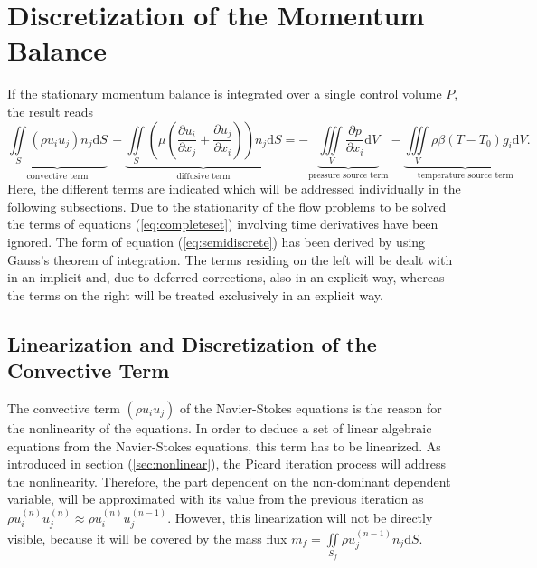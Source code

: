 \section{Discretization of the Momentum Balance}
\label{sec:segdiscretization}

If the stationary momentum balance is integrated over a single control volume \(P\), the result reads
\begin{equation}
  \label{eq:semidiscrete}
  \underbrace{\iint\limits_S (\rho u_i u_j)n_j \mathrm{d}S}_{\text{convective term}}
  \,- \underbrace{\iint\limits_S \left(\mu \left( \frac{\partial u_i}{\partial x_j} + \frac{\partial u_j}{\partial x_i}\right)\right)n_j \mathrm{d}S}_{\text{diffusive term}}
  = - \underbrace{\iiint\limits_V \frac{\partial p}{\partial x_i} \mathrm{d}V}_{\text{pressure source term}}
  - \underbrace{\iiint\limits_V \rho \beta \left(T - T_0\right) g_i \mathrm{d}V}_{\text{temperature source term}}.
\end{equation}
Here, the different terms are indicated which will be addressed individually in the following subsections. Due to the stationarity of the flow problems to be solved the terms of equations (\ref{eq:completeset}) involving time derivatives have been ignored. The form of equation (\ref{eq:semidiscrete}) has been derived by using Gauss's theorem of integration. The terms residing on the left will be dealt with in an implicit and, due to deferred corrections, also in an explicit way, whereas the terms on the right will be treated exclusively in an explicit way.

\subsection{Linearization and Discretization of the Convective Term}
\label{sec:segconvective}

The convective term \(\left( \rho u_i u_j \right)\) of the Navier-Stokes equations is the reason for the nonlinearity of the equations. In order to deduce a set of linear algebraic equations from the Navier-Stokes equations, this term has to be linearized. As introduced in section (\ref{sec:nonlinear}), the Picard iteration process will address the nonlinearity. Therefore, the part dependent on the non-dominant dependent variable, will be approximated with its value from the previous iteration as \( \rho u_i^{(n)} u_j^{(n)} \approx \rho u_i^{(n)} u_j^{(n-1)} \). However, this linearization will not be directly visible, because it will be covered by the mass flux \(\textstyle \dot{m}_f = \iint\limits_{S_f} \rho u_j^{(n-1)} n_j \mathrm{d}S \). 

